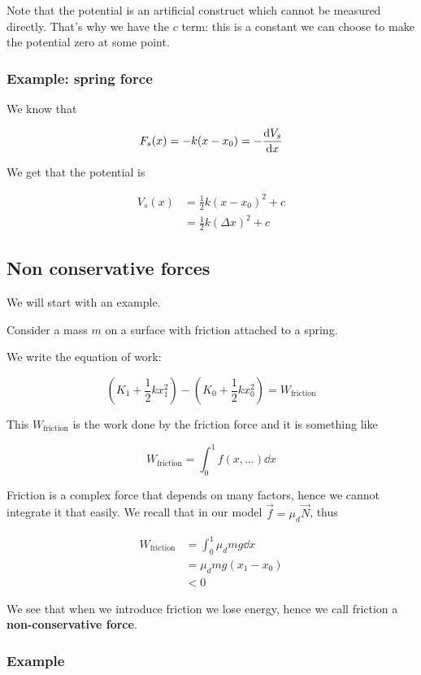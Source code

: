 \documentclass[10pt]{extarticle}
\begin{document}
Note that the potential is an artificial construct which cannot be measured directly.
That's why we have the $c$ term: this is a constant we can choose to make the potential zero at some point.

\subsubsection{Example: spring force}

We know that

$$
    F_s(x) = -k (x - x_0) = - \dv{V_s}{x}(x)
$$

We get that the potential is

\begin{align*}
    V_s(x) & = \frac{1}{2} k (x - x_0)^2 + c  \\
           & = \frac{1}{2} k (\Delta x)^2 + c
\end{align*}

\subsection{Non conservative forces}

We will start with an example.

Consider a mass $m$ on a surface with friction attached to a spring.

We write the equation of work:

$$
    (K_1 + \frac{1}{2}kx_1^2) - (K_0 + \frac{1}{2}kx_0^2) = W_{\text{friction}}
$$

This $W_{\text{friction}}$ is the work done by the friction force and it is something like

$$
    W_{\text{friction}} = \int_0^1 f(x, \ldots) \dd{x}
$$

Friction is a complex force that depends on many factors, hence we cannot integrate it that easily. We recall that in our model $\vec f = \mu_d \vec N$, thus

\begin{align*}
    W_{\text{friction}} & = \int_0^1 \mu_d mg \dd{x} \\
                        & = \mu_d mg (x_1 - x_0)     \\
                        & < 0
\end{align*}

We see that when we introduce friction we lose energy, hence we call friction a \textbf{non-conservative force}.

\subsubsection{Example}
\end{document}
